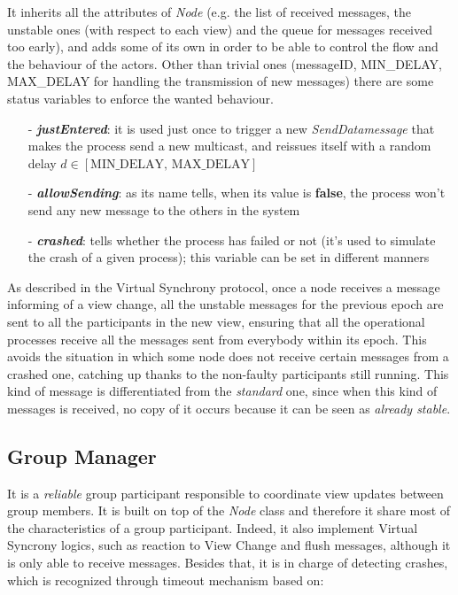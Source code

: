 \documentclass[11pt]{article}
\begin{document}
	It inherits all the attributes of \textit{Node} (e.g. the list of received messages, the unstable ones (with respect to each view) and the queue for messages received too early), and adds some of its own in order to be able to control the flow and the behaviour of the actors. Other than trivial ones (messageID, MIN\_DELAY, MAX\_DELAY for handling the transmission of new messages) there are some status variables to enforce the wanted behaviour. 
	\begin{itemize}
		\item [-] \textit{\textbf{justEntered}}: it is used just once to trigger a new \textit{SendDatamessage} that makes the process send a new multicast, and reissues itself with a random delay $d \in [\text{MIN\_DELAY, MAX\_DELAY}]$
		\item [-] \textit{\textbf{allowSending}}: as its name tells, when its value is \textbf{false}, the process won't send any new message to the others in the system
		\item [-] \textit{\textbf{crashed}}: tells whether the process has failed or not (it's used to simulate the crash of a given process); this variable can be set in different manners 
	\end{itemize}
	As described in the Virtual Synchrony protocol, once a node receives a message informing of a view change, all the unstable messages for the previous epoch are sent to all the participants in the new view, ensuring that all the operational processes receive all the messages sent from everybody within its epoch. This avoids the situation in which some node does not receive certain messages from a crashed one, catching up thanks to the non-faulty participants still running.
	This kind of message is differentiated from the \textit{standard} one, since when this kind of messages is received, no copy of it occurs because it can be seen as \textit{already stable}.
	
	\subsection{Group Manager}
	It is a \textit{reliable} group participant responsible to coordinate view updates between group members. It is built on top of the \textit{Node} class and therefore it share most of the characteristics of a group participant. Indeed, it also implement Virtual Syncrony logics, such as reaction to View Change and flush messages, although it is only able to receive messages. Besides that, it is in charge of detecting crashes, which is recognized through timeout mechanism based on:
	
\end{document}
